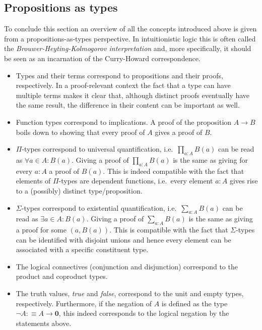 \subsection{Propositions as types}

    To conclude this section an overview of all the concepts introduced above is given from a propositions-as-types perspective. In intuitionistic logic this is often called the \textit{Brouwer-Heyting-Kolmogorov interpretation} and, more specifically, it should be seen as an incarnation of the Curry-Howard correspondence.

    \begin{itemize}
        \item Types and their terms correspond to propositions and their proofs, respectively. In a proof-relevant context the fact that a type can have multiple terms makes it clear that, although distinct proofs eventually have the same result, the difference in their content can be important as well.
        \item Function types correspond to implications. A proof of the proposition $A\rightarrow B$ boils down to showing that every proof of $A$ gives a proof of $B$.
        \item $\Pi$-types correspond to universal quantification, i.e.~$\prod_{a:A}B(a)$ can be read as $\forall a\in A: B(a)$. Giving a proof of $\prod_{a:A}B(a)$ is the same as giving for every $a:A$ a proof of $B(a)$. This is indeed compatible with the fact that elements of $\Pi$-types are dependent functions, i.e.~every element $a:A$ gives rise to a (possibly) distinct type/proposition.
        \item $\Sigma$-types correspond to existential quantification, i.e.~$\sum_{a:A}B(a)$ can be read as $\exists a\in A:B(a)$. Giving a proof of $\sum_{a:A}B(a)$ is the same as giving a proof for some $(a, B(a))$. This is compatible with the fact that $\Sigma$-types can be identified with disjoint unions and hence every element can be associated with a specific constituent type.
        \item The logical connectives (conjunction and disjunction) correspond to the product and coproduct types.
        \item The truth values, \textit{true} and \textit{false}, correspond to the unit and empty types, respectively. Furthermore, if the negation of $A$ is defined as the type $\lnot A:\equiv A\rightarrow\mathbf{0}$, this indeed corresponds to the logical negation by the statements above.
    \end{itemize}


